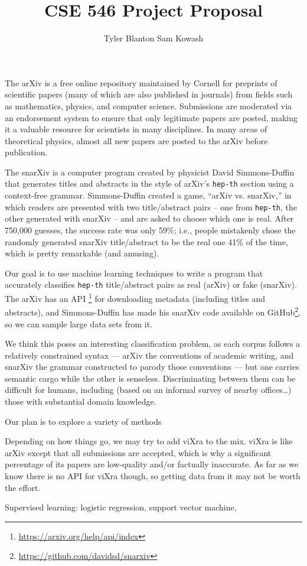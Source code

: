 \documentclass[11pt,letterpaper]{article}
\author{Tyler Blanton \quad Sam Kowash}
\title{CSE 546 Project Proposal}
\numberwithin{equation}{section}
\numberwithin{figure}{section}
\begin{document}
\maketitle

The arXiv is a free online repository maintained by Cornell for preprints of scientific papers (many of which are also published in journals) from fields such as mathematics, physics, and computer science.
Submissions are moderated via an endorsement system to ensure that only legitimate papers are posted, making it a valuable resource for scientists in many disciplines. In many areas of theoretical physics, almost all new papers are posted to the arXiv before publication.

The snarXiv is a computer program created by physicist David Simmons-Duffin that generates titles and abstracts in the style of arXiv's \texttt{hep-th} section using a context-free grammar.
Simmons-Duffin created a game, ``arXiv vs. snarXiv,'' in which readers are presented with two title/abstract pairs -- one from \texttt{hep-th}, the other generated with snarXiv -- and are asked to choose which one is real.
After 750,000 guesses, the success rate was only 59\%; i.e., people mistakenly chose the randomly generated snarXiv title/abstract to be the real one 41\% of the time, which is pretty remarkable (and amusing).

Our goal is to use machine learning techniques to write a program that accurately classifies \texttt{hep-th} title/abstract pairs as real (arXiv) or fake (snarXiv).
The arXiv has an API%
\footnote{\url{https://arxiv.org/help/api/index}}
for downloading metadata (including titles and abstracts), and Simmons-Duffin has made his snarXiv code available on GitHub\footnote{\url{https://github.com/davidsd/snarxiv}}, so we can sample large data sets from it.
%

We think this poses an interesting classification problem, as each corpus follows a relatively constrained syntax --- arXiv the conventions of academic writing, and snarXiv the grammar constructed to parody those conventions --- but one carries semantic cargo while the other is senseless. Discriminating between them can be difficult for humans, including (based on an informal survey of nearby offices\ldots) those with substantial domain knowledge.

Our plan is to explore a variety of methods 


Depending on how things go, we may try to add viXra to the mix.
viXra is like arXiv except that all submissions are accepted, which is why a significant percentage of its papers are low-quality and/or factually inaccurate.
As far as we know there is no API for viXra though, so getting data from it may not be worth the effort.


Supervised learning: logistic regression, support vector machine, 
\end{document}
